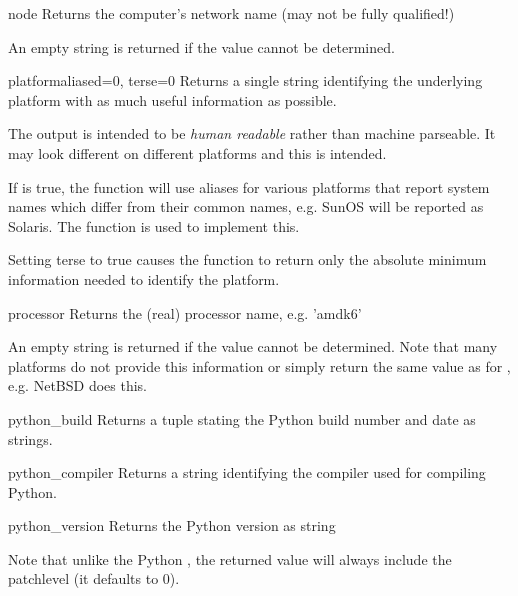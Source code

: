 \begin{funcdesc}{node}{}
  Returns the computer's network name (may not be fully qualified!)

  An empty string is returned if the value cannot be determined.
\end{funcdesc}

\begin{funcdesc}{platform}{aliased=0, terse=0}
	Returns a single string identifying the underlying platform
	with as much useful information as possible.
	
	The output is intended to be \emph{human readable} rather than
	machine parseable. It may look different on different
	platforms and this is intended.
	
	If  is true, the function will use aliases for
	various platforms that report system names which differ from
	their common names, e.g. SunOS will be reported as
	Solaris. The  function is used to implement
	this.
	
	Setting terse to true causes the function to return only the
	absolute minimum information needed to identify the platform.
\end{funcdesc}


\begin{funcdesc}{processor}{}
  Returns the (real) processor name, e.g. 'amdk6'

  An empty string is returned if the value cannot be
  determined. Note that many platforms do not provide this
  information or simply return the same value as for ,
  e.g.  NetBSD does this.
\end{funcdesc}

\begin{funcdesc}{python_build}{}
  Returns a tuple  stating the Python
  build number and date as strings.
\end{funcdesc}

\begin{funcdesc}{python_compiler}{}
  Returns a string identifying the compiler used for compiling
  Python.
\end{funcdesc}

\begin{funcdesc}{python_version}{}
  Returns the Python version as string 

  Note that unlike the Python , the returned value
  will always include the patchlevel (it defaults to 0).
\end{funcdesc}


